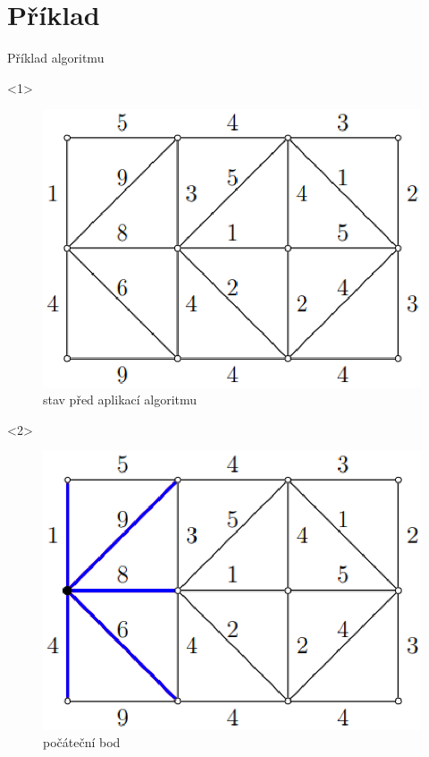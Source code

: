 \documentclass[pdf]{beamer}
\begin{document}
\section{Příklad}
\begin{centering}
\begin{frame}{Příklad algoritmu}
    \begin{onlyenv}<1>
        \begin{figure}[h!]
        \includegraphics[scale=0.5]{obr1.eps}
        \caption{\label{fig:obr1}stav před aplikací algoritmu}
        \end{figure}
    \end{onlyenv}
    
    \begin{onlyenv}<2>
        \begin{figure}[h!]
        \includegraphics[scale=0.5]{obr2.eps}
        \caption{\label{fig:obr2}počáteční bod}
        \end{figure}
    \end{onlyenv}
    

\end{frame}
\end{centering}
\end{document}
